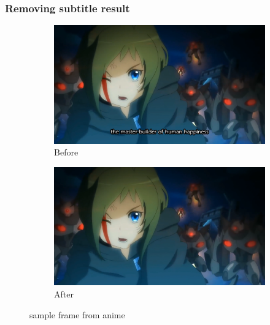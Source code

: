 \documentclass[xcolor=dvipsnames, xetex,serif]{beamer}
\begin{document}
    \begin{frame}
        \frametitle{Removing subtitle result}
        \begin{figure}[H]
            \centering
            \begin{subfigure}{0.45\linewidth}
                \centering
                \includegraphics[width=0.97\linewidth]{images/subtitle-remove/beforesubtitleremove.png}
                \caption{Before}
            \end{subfigure}
            \begin{subfigure}{0.45\linewidth}
                \centering
                \includegraphics[width=0.95\linewidth]{images/subtitle-remove/aftersubtitleremove.png}
                \caption{After}
            \end{subfigure}
            \caption{sample frame from anime}
        \end{figure}
    \end{frame}
\end{document}
